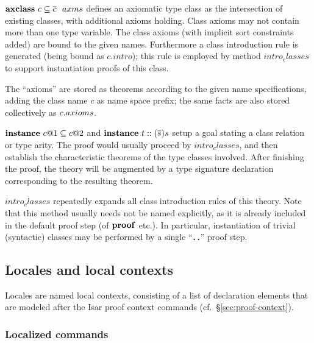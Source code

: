 \begin{descr}

\item [${\mathord{\mathbf{axclass}}}~c \subseteq \overline{c}~~axms$] defines an axiomatic type class as
  the intersection of existing classes, with additional axioms holding.  Class
  axioms may not contain more than one type variable.  The class axioms (with
  implicit sort constraints added) are bound to the given names.  Furthermore
  a class introduction rule is generated (being bound as $c{.}intro$); this
  rule is employed by method $intro_classes$ to support instantiation proofs
  of this class.

  The ``axioms'' are stored as theorems according to the given name
  specifications, adding the class name $c$ as name space prefix; the same
  facts are also stored collectively as $c{\mathord.}axioms$.
  
\item [${\mathord{\mathbf{instance}}}~c@1 \subseteq c@2$ and ${\mathord{\mathbf{instance}}}~t :: (\overline{s})s$] setup a
  goal stating a class relation or type arity.  The proof would usually
  proceed by $intro_classes$, and then establish the characteristic theorems
  of the type classes involved.  After finishing the proof, the theory will be
  augmented by a type signature declaration corresponding to the resulting
  theorem.

\item [$intro_classes$] repeatedly expands all class introduction rules of
  this theory.  Note that this method usually needs not be named explicitly,
  as it is already included in the default proof step (of ${\mathord{\mathbf{proof}}}$ etc.).
  In particular, instantiation of trivial (syntactic) classes may be performed
  by a single ``$\textbf{.\,.}$'' proof step.

\end{descr}


\subsection{Locales and local contexts}\label{sec:locale}

Locales are named local contexts, consisting of a list of declaration elements
that are modeled after the Isar proof context commands (cf.\
\S\ref{sec:proof-context}).


\subsubsection{Localized commands}

